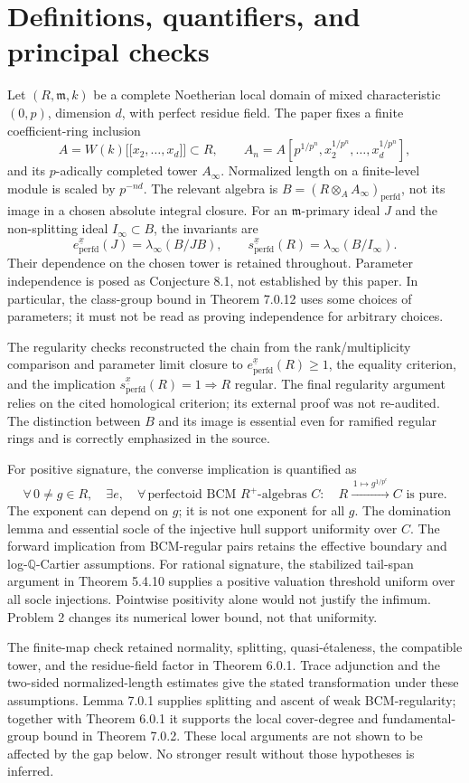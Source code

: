 \documentclass[10pt]{article}
\begin{document}
\section*{Definitions, quantifiers, and principal checks}
Let \((R,\mathfrak m,k)\) be a complete Noetherian local domain of mixed characteristic \((0,p)\), dimension \(d\), with perfect residue field. The paper fixes a finite coefficient-ring inclusion \[A=W(k)\mathopen{[\![}x_2,\ldots,x_d\mathclose{]\!]}\subset R,
 \qquad
 A_n=A[p^{1/p^n},x_2^{1/p^n},\ldots,x_d^{1/p^n}],\] and its \(p\)-adically completed tower \(A_\infty\). Normalized length on a finite-level module is scaled by \(p^{-nd}\). The relevant algebra is \(B=(R\otimes_A A_\infty)_{\mathrm{perfd}}\), not its image in a chosen absolute integral closure. For an \(\mathfrak m\)-primary ideal \(J\) and the non-splitting ideal \(I_\infty\subset B\), the invariants are \[e_{\mathrm{perfd}}^{\underline{x}}(J)=\lambda_\infty(B/JB),
 \qquad
 s_{\mathrm{perfd}}^{\underline{x}}(R)=\lambda_\infty(B/I_\infty).\] Their dependence on the chosen tower is retained throughout. Parameter independence is posed as Conjecture 8.1, not established by this paper. In particular, the class-group bound in Theorem 7.0.12 uses some choices of parameters; it must not be read as proving independence for arbitrary choices.\par
The regularity checks reconstructed the chain from the rank/multiplicity comparison and parameter limit closure to \(e_{\mathrm{perfd}}^{\underline{x}}(R)\geq1\), the equality criterion, and the implication \(s_{\mathrm{perfd}}^{\underline{x}}(R)=1\Rightarrow R\) regular. The final regularity argument relies on the cited homological criterion; its external proof was not re-audited. The distinction between \(B\) and its image is essential even for ramified regular rings and is correctly emphasized in the source.\par
For positive signature, the converse implication is quantified as \[\forall\,0\ne g\in R,\quad \exists e,\quad
 \forall\,\text{perfectoid BCM }R^+\text{-algebras }C:
 \quad R\xrightarrow{\,1\mapsto g^{1/p^e}\,}C
 \text{ is pure}.\] The exponent can depend on \(g\); it is not one exponent for all \(g\). The domination lemma and essential socle of the injective hull support uniformity over \(C\). The forward implication from BCM-regular pairs retains the effective boundary and log-\(\mathbb Q\)-Cartier assumptions. For rational signature, the stabilized tail-span argument in Theorem 5.4.10 supplies a positive valuation threshold uniform over all socle injections. Pointwise positivity alone would not justify the infimum. Problem 2 changes its numerical lower bound, not that uniformity.\par
The finite-map check retained normality, splitting, quasi-étaleness, the compatible tower, and the residue-field factor in Theorem 6.0.1. Trace adjunction and the two-sided normalized-length estimates give the stated transformation under these assumptions. Lemma 7.0.1 supplies splitting and ascent of weak BCM-regularity; together with Theorem 6.0.1 it supports the local cover-degree and fundamental-group bound in Theorem 7.0.2. These local arguments are not shown to be affected by the gap below. No stronger result without those hypotheses is inferred.\par
\end{document}
